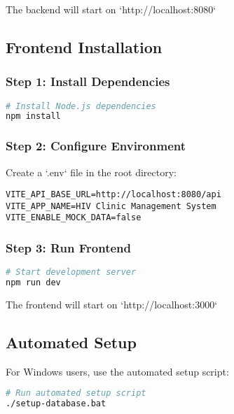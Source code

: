 \documentclass[12pt,a4paper]{article}
\begin{document}
The backend will start on `http://localhost:8080`

\subsection{Frontend Installation}

\subsubsection{Step 1: Install Dependencies}

\begin{lstlisting}[language=bash, caption=Frontend Dependencies]
# Install Node.js dependencies
npm install
\end{lstlisting}

\subsubsection{Step 2: Configure Environment}

Create a `.env` file in the root directory:

\begin{lstlisting}[language=properties, caption=Environment Configuration]
VITE_API_BASE_URL=http://localhost:8080/api
VITE_APP_NAME=HIV Clinic Management System
VITE_ENABLE_MOCK_DATA=false
\end{lstlisting}

\subsubsection{Step 3: Run Frontend}

\begin{lstlisting}[language=bash, caption=Frontend Run]
# Start development server
npm run dev
\end{lstlisting}

The frontend will start on `http://localhost:3000`

\subsection{Automated Setup}

For Windows users, use the automated setup script:

\begin{lstlisting}[language=bash, caption=Automated Setup]
# Run automated setup script
./setup-database.bat
\end{lstlisting}
\end{document}
